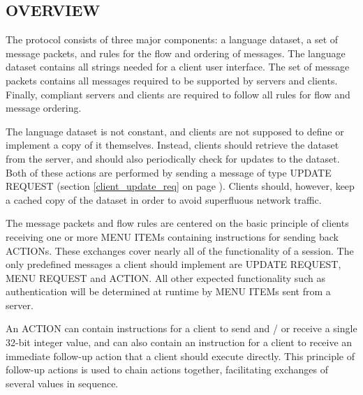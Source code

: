 \documentclass[a4paper,11pt]{article}
\begin{document}
\subsection{OVERVIEW}
\hfill\begin{minipage}{\dimexpr\textwidth-1.13cm}
The protocol consists of three major components: a language dataset,
a set of message packets, and rules for the flow and ordering of messages.
The language dataset contains all strings needed for a client user
interface. The set of message packets contains all messages required
to be supported by servers and clients. Finally, compliant servers and
clients are required to follow all rules for flow and message ordering.

\vspace{0.3cm}

The language dataset is not constant, and clients are not supposed
to define or implement a copy of it themselves. Instead, clients should
retrieve the dataset from the server, and should also periodically check
for updates to the dataset. Both of these actions are performed by
sending a message of type UPDATE REQUEST (section \ref{client_update_req}
on page \pageref{client_update_req}). Clients should, however, keep
a cached copy of the dataset in order to avoid superfluous network
traffic.

\vspace{0.3cm}

The message packets and flow rules are centered on the basic principle
of clients receiving one or more MENU ITEMs containing instructions
for sending back ACTIONs. These exchanges cover nearly all of the
functionality of a session. The only predefined messages a client should
implement are UPDATE REQUEST, MENU REQUEST and ACTION. All other
expected functionality such as authentication will be determined at
runtime by MENU ITEMs sent from a server.

\vspace{0.3cm}
An ACTION can contain instructions for a client to send and / or
receive a single 32-bit integer value, and can also contain an
instruction for a client to receive an immediate follow-up action
that a client should execute directly. This principle of follow-up
actions is used to chain actions together, facilitating exchanges
of several values in sequence.

\end{minipage}
\newpage
\end{document}

